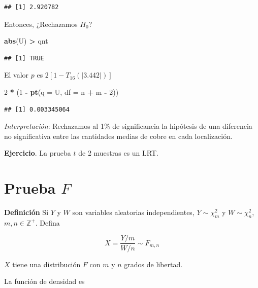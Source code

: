 \documentclass[
  12pt,
]{book}
\newenvironment{Shaded}{\begin{snugshade}}{\end{snugshade}}
\newcommand{\DataTypeTok}[1]{\textcolor[rgb]{0.13,0.29,0.53}{#1}}
\newcommand{\DecValTok}[1]{\textcolor[rgb]{0.00,0.00,0.81}{#1}}
\newcommand{\KeywordTok}[1]{\textcolor[rgb]{0.13,0.29,0.53}{\textbf{#1}}}
\newcommand{\NormalTok}[1]{#1}
\newcommand{\OperatorTok}[1]{\textcolor[rgb]{0.81,0.36,0.00}{\textbf{#1}}}
\newcommand{\StringTok}[1]{\textcolor[rgb]{0.31,0.60,0.02}{#1}}
\begin{document}
\begin{verbatim}
## [1] 2.920782
\end{verbatim}

Entonces, ¿Rechazamos \(H_0\)?

\begin{Shaded}
\begin{Highlighting}[]
\KeywordTok{abs}\NormalTok{(U) }\OperatorTok{\textgreater{}}\StringTok{ }\NormalTok{qnt}
\end{Highlighting}
\end{Shaded}

\begin{verbatim}
## [1] TRUE
\end{verbatim}

El valor \(p\) es \(2[1-T_{16}(|3.442|)]\)

\begin{Shaded}
\begin{Highlighting}[]
\DecValTok{2} \OperatorTok{*}\StringTok{ }\NormalTok{(}\DecValTok{1} \OperatorTok{{-}}\StringTok{ }\KeywordTok{pt}\NormalTok{(}\DataTypeTok{q =}\NormalTok{ U, }\DataTypeTok{df =}\NormalTok{ n }\OperatorTok{+}\StringTok{ }\NormalTok{m }\OperatorTok{{-}}\StringTok{ }\DecValTok{2}\NormalTok{))}
\end{Highlighting}
\end{Shaded}

\begin{verbatim}
## [1] 0.003345064
\end{verbatim}

\emph{Interpretación}: Rechazamos al 1\% de significancia la hipótesis de una
diferencia no significativa entre las cantidades medias de cobre en cada
localización.

\textbf{Ejercicio}. La prueba \(t\) de 2 muestras es un LRT.

\hypertarget{prueba-f}{%
\section{\texorpdfstring{Prueba \(F\)}{Prueba F}}\label{prueba-f}}

\textbf{Definición} Si \(Y\) y \(W\) son variables aleatorias independientes, \(Y\sim \chi^2_m\) y \(W\sim \chi ^2_n\), \(m,n\in \mathbb Z^+\). Defina

\[X = \dfrac{Y/m}{W/n}\sim F_{m,n}\]

\(X\) tiene una distribución \(F\) con \(m\) y
\(n\) grados de libertad.

La función de densidad es
\end{document}

